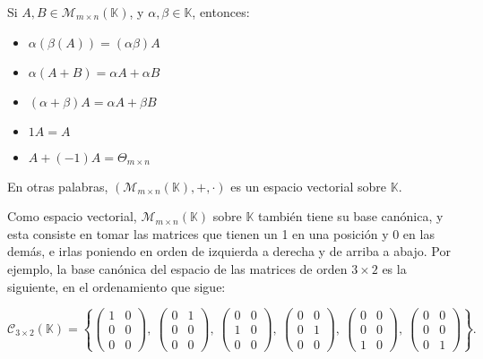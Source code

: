 \documentclass[12pt]{book}
\def\K{\mathbb{K}}
\begin{document}
Si $A,B\in\mathcal{M}_{m\times n}(\K)$, y $\alpha,\beta\in\K$, entonces:

\begin{multicols}{3}
\begin{itemize}
\item $\alpha(\beta(A))=(\alpha \beta)A$
\item $\alpha(A+B)=\alpha A+\alpha B$
\item $(\alpha+\beta)A=\alpha A+\beta B$
\item $1A=A$
\item $A+(-1)A=\Theta_{m\times n}$
\end{itemize}
\end{multicols}

En otras palabras, $(\mathcal{M}_{m\times n}(\K),+,\cdot)$ es un espacio vectorial sobre $\K$.

Como espacio vectorial, $\mathcal{M}_{m\times n}(\K)$ sobre $\K$ también tiene su base canónica, y esta consiste en tomar las matrices que tienen un 1 en una posición y 0 en las demás, e irlas poniendo en orden de izquierda a derecha y de arriba a abajo.
Por ejemplo, la base canónica del espacio de las matrices de orden $3\times 2$ es la siguiente, en el ordenamiento que sigue:

$$\mathcal{C}_{3\times 2}(\K)=\left\{\left(\begin{array}{cc} 1&0\\ 0&0\\0&0\end{array}\right),\ 
\left(\begin{array}{cc} 0&1\\ 0&0\\0&0\end{array}\right),\
\left(\begin{array}{cc} 0&0\\ 1&0\\0&0\end{array}\right),\ 
\left(\begin{array}{cc} 0&0\\ 0&1\\0&0\end{array}\right),\ 
\left(\begin{array}{cc} 0&0\\ 0&0\\1&0\end{array}\right),\
\left(\begin{array}{cc} 0&0\\ 0&0\\0&1\end{array}\right)
\right\}.$$
\end{document}
